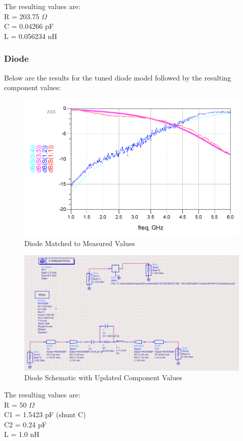 \documentclass{article} %
\begin{document}
	The resulting values are: \\
	R = 203.75 $\Omega$ \\
	C = 0.04266 pF \\
	L = 0.056234 nH
	
	\vfill
	\clearpage
	
	\subsubsection{Diode}
	Below are the results for the tuned diode model followed by the resulting component values:
	
	\begin{figure}[h]
		\centering
		\caption{Diode Matched to Measured Values}
		\includegraphics[scale=.6]{DiodeMatched}
	\end{figure}
	
	
	\begin{figure}[h]
		\centering
		\caption{Diode Schematic with Updated Component Values}
		\includegraphics[scale=.45]{DiodeMatched_schematic}
	\end{figure}
	
	The resulting values are:\\
	R = 50 $\Omega$ \\
	C1 = 1.5423 pF (shunt C) \\
	C2 = 0.24 pF \\
	L = 1.0 nH
	
	\vfill
\end{document}
